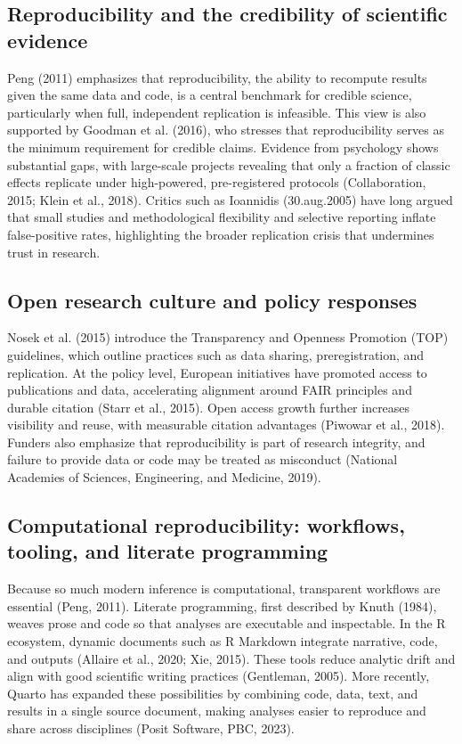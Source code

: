 \documentclass[
  a4paper,
]{article}
\begin{document}
\subsection{Reproducibility and the credibility of scientific
evidence}\label{reproducibility-and-the-credibility-of-scientific-evidence}

Peng (2011) emphasizes that reproducibility, the ability to recompute
results given the same data and code, is a central benchmark for
credible science, particularly when full, independent replication is
infeasible. This view is also supported by Goodman et al. (2016), who
stresses that reproducibility serves as the minimum requirement for
credible claims. Evidence from psychology shows substantial gaps, with
large-scale projects revealing that only a fraction of classic effects
replicate under high-powered, pre-registered protocols (Collaboration,
2015; Klein et al., 2018). Critics such as Ioannidis (30.aug.2005) have
long argued that small studies and methodological flexibility and
selective reporting inflate false-positive rates, highlighting the
broader replication crisis that undermines trust in research.

\subsection{Open research culture and policy
responses}\label{open-research-culture-and-policy-responses}

Nosek et al. (2015) introduce the Transparency and Openness Promotion
(TOP) guidelines, which outline practices such as data sharing,
preregistration, and replication. At the policy level, European
initiatives have promoted access to publications and data, accelerating
alignment around FAIR principles and durable citation (Starr et al.,
2015). Open access growth further increases visibility and reuse, with
measurable citation advantages (Piwowar et al., 2018). Funders also
emphasize that reproducibility is part of research integrity, and
failure to provide data or code may be treated as misconduct (National
Academies of Sciences, Engineering, and Medicine, 2019).

\subsection{Computational reproducibility: workflows, tooling, and
literate
programming}\label{computational-reproducibility-workflows-tooling-and-literate-programming}

Because so much modern inference is computational, transparent workflows
are essential (Peng, 2011). Literate programming, first described by
Knuth (1984), weaves prose and code so that analyses are executable and
inspectable. In the R ecosystem, dynamic documents such as R Markdown
integrate narrative, code, and outputs (Allaire et al., 2020; Xie,
2015). These tools reduce analytic drift and align with good scientific
writing practices (Gentleman, 2005). More recently, Quarto has expanded
these possibilities by combining code, data, text, and results in a
single source document, making analyses easier to reproduce and share
across disciplines (Posit Software, PBC, 2023).
\end{document}
